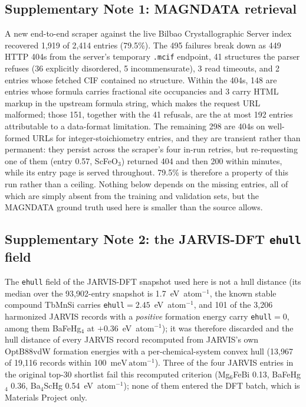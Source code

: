 \documentclass[aps,prb,preprint,superscriptaddress,longbibliography,nofootinbib]{revtex4-2}
\newcommand{\meVat}{\ensuremath{\mathrm{meV\,atom^{-1}}}}
\begin{document}
\subsection*{Supplementary Note 1: MAGNDATA retrieval}

A new end-to-end scraper against the live Bilbao Crystallographic Server
index recovered 1{,}919 of 2{,}414 entries (79.5\%). The 495 failures break down as 449 HTTP 404s from the
server's temporary \texttt{.mcif} endpoint, 41 structures the parser refuses (36 explicitly disordered, 5
incommensurate), 3 read timeouts, and 2 entries whose fetched CIF contained no structure. Within the 404s, 148
are entries whose formula carries fractional site occupancies and 3 carry HTML markup in the upstream formula
string, which makes the request URL malformed; those 151, together with the 41 refusals, are the at most 192
entries attributable to a data-format limitation. The remaining 298 are 404s on well-formed URLs for
integer-stoichiometry entries, and they are transient rather than permanent: they persist across the
scraper's four in-run retries, but re-requesting one of them (entry 0.57, ScFeO$_3$) returned 404 and then
200 within minutes, while its entry page is served throughout. 79.5\% is therefore a property of this run
rather than a ceiling. Nothing below depends on the missing entries, all of which are simply absent from the
training and validation sets, but the MAGNDATA ground truth used here is smaller than the source allows.

\subsection*{Supplementary Note 2: the JARVIS-DFT \texttt{ehull} field}

The \texttt{ehull} field of the JARVIS-DFT snapshot used here is not a hull distance (its median over the
93{,}902-entry snapshot is 1.7~eV~atom$^{-1}$, the known stable compound TbMnSi carries
\texttt{ehull}$=2.45$~eV~atom$^{-1}$, and 101 of the 3{,}206 harmonized JARVIS records with a \emph{positive}
formation energy carry \texttt{ehull}$=0$, among them BaFeHg$_4$ at $+0.36$~eV~atom$^{-1}$); it was therefore
discarded and the hull distance of every JARVIS record recomputed from JARVIS's own OptB88vdW formation
energies with a per-chemical-system convex hull (13{,}967 of 19{,}116 records within 100~\meVat). Three
of the four JARVIS entries in the original top-30 shortlist fail this recomputed criterion (Mg$_6$FeBi 0.13,
BaFeHg$_4$ 0.36, Ba$_4$ScHg 0.54~eV~atom$^{-1}$); none of them entered the DFT batch, which is Materials
Project only.
\end{document}
